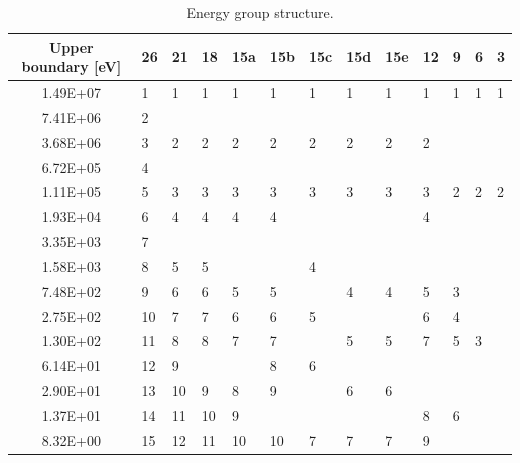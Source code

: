 \documentclass[11pt,letterpaper]{article}
\begin{document}
\begin{table}[htbp!]
  \centering
  \caption{Energy group structure.}
  \begin{tabular}{c|l|l|l|l|l|l|l|l|l|l|l|l}
  \toprule
  Upper boundary [eV] & 26    & 21   & 18   & 15a & 15b & 15c & 15d & 15e   & 12  & 9  & 6  & 3 \\
  \midrule
  1.49E+07            & 1     & 1    & 1    & 1   & 1   & 1   & 1   & 1     & 1   & 1  & 1  & 1 \\ \cline{1-2}
  7.41E+06            & 2     &      &      &     &     &     &     &       &     &    &    &   \\ \cline{1-10}
  3.68E+06            & 3     & 2    & 2    & 2   & 2   & 2   & 2   & 2     & 2   &    &    &   \\ \cline{1-2}
  6.72E+05            & 4     &      &      &     &     &     &     &       &     &    &    &   \\ \hline
  1.11E+05            & 5     & 3    & 3    & 3   & 3   & 3   & 3   & 3     & 3   & 2  & 2  & 2 \\ \cline{1-6} \cline{10-10}
  1.93E+04            & 6     & 4    & 4    & 4   & 4   &     &     &       & 4   &    &    &   \\ \cline{1-2}
  3.35E+03            & 7     &      &      &     &     &     &     &       &     &    &    &   \\ \cline{1-4} \cline{7-7}
  1.58E+03            & 8     & 5    & 5    &     &     & 4   &     &       &     &    &    &   \\ \cline{1-6} \cline{8-11}
  7.48E+02            & 9     & 6    & 6    & 5   & 5   &     & 4   & 4     & 5   & 3  &    &   \\ \cline{1-7} \cline{10-11}
  2.75E+02            & 10    & 7    & 7    & 6   & 6   & 5   &     &       & 6   & 4  &    &   \\ \cline{1-6} \cline{8-12}
  1.30E+02            & 11    & 8    & 8    & 7   & 7   &     & 5   & 5     & 7   & 5  & 3  &   \\ \cline{1-3} \cline{6-7}
  6.14E+01            & 12    & 9    &      &     & 8   & 6   &     &       &     &    &    &   \\ \cline{1-6} \cline{8-9}
  2.90E+01            & 13    & 10   & 9    & 8   & 9   &     & 6   & 6     &     &    &    &   \\ \cline{1-5} \cline{10-11}
  1.37E+01            & 14    & 11   & 10   & 9   &     &     &     &       & 8   & 6  &    &   \\ \cline{1-10}
  8.32E+00            & 15    & 12   & 11   & 10  & 10  & 7   & 7   & 7     & 9   &    &    &   \\ \cline{1-2}

\end{tabular}
\end{table}
\end{document}
